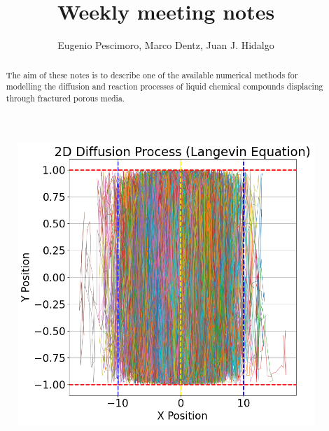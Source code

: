\documentclass{cup-ino}
\title{Weekly meeting notes}
\author{Eugenio Pescimoro, Marco Dentz, Juan J. Hidalgo}
\begin{document}
\maketitle

\begin{abstract}
The aim of these notes is to describe one of the available numerical methods for modelling the diffusion and reaction processes of liquid chemical compounds displacing through fractured porous media.
\end{abstract}

\begin{figure}[bt!]
\begin{minipage}{0.47\textwidth}
\includegraphics[width=\linewidth]{images/trajectoriesInfinite.png}
\end{minipage}
\hfill
\begin{minipage}{0.47\textwidth}

\end{minipage}
\end{figure}
\end{document}
